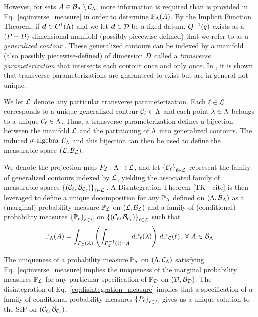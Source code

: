 However, for sets $A \in \mathcal{B}_{{\Lambda}} \setminus \mathcal{C}_{{\Lambda}}$, more information is required than is provided in Eq.~\eqref{eq:inverse_measure} in order to determine $\operatorname*{\mathbb{P}_{{\Lambda}}} (A)$. 
By the Implicit Function Theorem, if $\operatorname*{\boldsymbol{d}} \in C^1 ({\Lambda})$ and we let $\operatorname*{\boldsymbol{d}}\in\mathcal{D}$ be a fixed datum, $Q^{-1}(q)$ exists as a $(P-D)$\--dimensional manifold (possibly piecewise-defined) that we refer to as a \emph{generalized contour} \cite{BET+14}. 
These generalized contours can be indexed by a manifold (also possibly piecewise-defined) of dimension $D$ called a \emph{transverse parameterization} that intersects each contour once and only once. 
In \cite{BET+14}, it is shown that transverse parameterizations are guaranteed to exist but are in general not unique.

We let $\mathcal{L}$ denote any particular transverse parameterization. 
Each $\ell\in\mathcal{L}$ corresponds to a unique generalized contour $\mathcal{C}_\ell \in {\Lambda}$ and each point $\lambda\in{\Lambda}$ belongs to a unique $\mathcal{C}_\ell\in{\Lambda}$.
Thus, a transverse parameterization defines a bijection between the manifold $\mathcal{L}$ and the partitioning of ${\Lambda}$ into generalized contours. 
The induced $\sigma\text{-algebra}$ $\mathcal{C}_{{\Lambda}}$ and this bijection can then be used to define the measurable space $(\mathcal{L}, \mathcal{B}_{\mathcal{L}})$. 

We denote the projection map $P_{\mathcal{L}} :{\Lambda} \to \mathcal{L}$, and let $\left\{\mathcal{C}_\ell\right\}_{\ell\in\mathcal{L}}$ represent the family of generalized contours indexed by $\mathcal{L}$, yielding the associated family of measurable spaces $\left\{\left ( \mathcal{C}_\ell, \mathcal{B}_{\mathcal{C}_\ell} \right )\right\}_{\ell\in\mathcal{L}}{}$. 
A Disintegration Theorem [TK - cite] is then leveraged to define a unique decomposition for any $\operatorname*{\mathbb{P}_{{\Lambda}}}$ defined on $({\Lambda}, \mathcal{B}_{{\Lambda}})$ as a (marginal) probability measure $\mathbb{P}_{\mathcal{L}}$ on $(\mathcal{L}, \mathcal{B}_{\mathcal{L}})$ and a family of (conditional) probability measures $\left\{\mathbb{P}_\ell\right\}_{\ell\in\mathcal{L}}$ on $\left\{\left ( \mathcal{C}_\ell, \mathcal{B}_{\mathcal{C}_\ell} \right )\right\}_{\ell\in\mathcal{L}}$ such that 
\begin{equation}\label{eq:disintegration_measure}
\operatorname*{\mathbb{P}_{{\Lambda}}} (A) = \int_{P_{\mathcal{L}}(A)} \left ( \int_{P_{\mathcal{L}}^{-1} (\ell) \cap A}\, d\mathbb{P}_\ell(\lambda) \right )\, d\mathbb{P}_{\mathcal{L}} (\ell), \; \forall \; A \in \mathcal{B}_{{\Lambda}} 
\end{equation}


The uniqueness of a probability measure $\operatorname*{\mathbb{P}_{{\Lambda}}}$ on ${({\Lambda}, \mathcal{C}_{{\Lambda}})}$ satisfying Eq.~\eqref{eq:inverse_measure} implies the uniqueness of the marginal probability measures $\mathbb{P}_{\mathcal{L}}$ for any particular specification of $\operatorname*{\mathbb{P}_{\mathcal{D}}}$ on ${(\mathcal{D}, \mathcal{B}_{\mathcal{D}})}$. 
The disintegration of Eq.~\eqref{eq:disintegration_measure} implies that a specification of a family of conditional probability measures $\left\{P_\ell\right\}_{\ell\in\mathcal{L}}$ gives us a unique solution to the SIP on ${(\mathcal{C}_\ell, \mathcal{B}_{\mathcal{C}_\ell})}$.
 
